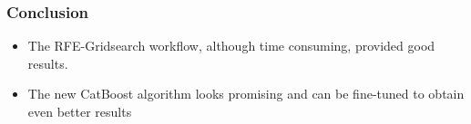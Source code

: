 \documentclass{beamer}
\begin{document}
\begin{frame}
	
	\frametitle{Conclusion}
	
	\begin{itemize}
		\item The RFE-Gridsearch workflow, although time consuming, provided good results.
		\item The new CatBoost algorithm looks promising and can be fine-tuned to obtain even better results
	\end{itemize}
	
	
\end{frame}
\end{document}
